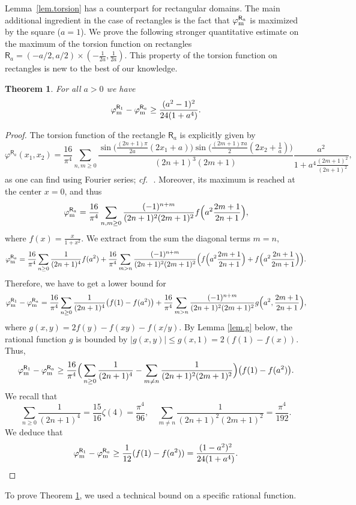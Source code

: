 \documentclass[11pt,a4paper]{amsart}
\newcounter{counter_a}
\newcommand{\cf}{{\it cf.}\,}
\numberwithin{figure}{section}
\numberwithin{equation}{section}
\theoremstyle{plain}%
\theoremstyle{remark}
\theoremstyle{plain}
\newtheorem{theorem}{Theorem}
\begin{document}
Lemma~\ref{lem.torsion} has a counterpart for rectangular domains. The main additional ingredient in the case of rectangles is the fact that $\varphi^{\mathsf R_a}_{\rm m}$ is maximized by the square ($a=1$). We prove the following
stronger quantitative estimate on the maximum of the torsion function on rectangles $\mathsf R_a=(-a/2,a/2)\times (- \frac{1}{2a},\frac{1}{2a})$. This property of the torsion function on rectangles is new to the best of our knowledge. 
\begin{theorem}\label{thm.rect}
	For all $a>0$ we have
	\[  \varphi_{\rm m}^{\mathsf R_1} - \varphi_{\rm m}^{\mathsf R_a} \geq \frac{(a^2-1)^2}{24(1+a^4)}.\]
\end{theorem}

\begin{proof}
	The torsion function of the rectangle $\mathsf R_a$ is explicitly given by
	\[ \varphi^{\mathsf R_a}(x_1,x_2) = \frac{16}{\pi^4} \sum_{n, m \geq 0} \frac{\sin \Big( \frac{(2n+1)\pi}{2a}(2x_1+a) \Big) \sin \Big( \frac{(2m+1)\pi a}{2}(2x_2+ \frac 1a) \Big)}{(2n+1)^3(2m+1)} \frac{a^2}{1+ a^4\frac{(2m+1)^2}{(2n+1)^2}},\]
	as one can find using Fourier series; \cf~\cite[Section 7]{BM24}. Moreover, its maximum is reached at the center $x=0$, and thus
	\[ \varphi_{\rm m}^{\mathsf R_a} = \frac{16}{\pi^4} \sum_{n,m \geq 0} \frac{(-1)^{n+m}}{(2n+1)^2(2m+1)^2}f \Big( a^2 \frac{2m+1}{2n+1} \Big),\]
	where $f(x) = \frac{x}{1+x^2}$. We extract from the sum the diagonal terms $m=n$,
	\[ \varphi_{\rm m}^{\mathsf R_a} = \frac{16}{\pi^4} \sum_{n \geq 0} \frac{1}{(2n+1)^4} f(a^2) + \frac{16}{\pi^4} \sum_{m >n}  \frac{(-1)^{n+m}}{(2n+1)^2(2m+1)^2} \Big( f \Big( a^2 \frac{2m+1}{2n+1} \Big) + f \Big( a^2 \frac{2n+1}{2m+1} \Big) \Big).\]
	Therefore, we have to get a lower bound for
	\[ \varphi_{{\rm m}}^{\mathsf R_1} - \varphi_{{\rm m}}^{\mathsf R_a} = \frac{16}{\pi^4} \sum_{n \geq 0} \frac{1}{(2n+1)^4} \big( f(1)-f(a^2) \big) + \frac{16}{\pi^4} \sum_{m >n}  \frac{(-1)^{n+m}}{(2n+1)^2(2m+1)^2} g \Big(a^2, \frac{2m+1}{2n+1} \Big),\]
	where $g(x,y) = 2f(y) - f(xy) - f(x/y)$.  By Lemma \ref{lem.g} below, the rational function $g$ is bounded by $|g(x,y)| \leq g(x,1) = 2(f(1)-f(x))$. Thus,
	\[ \varphi_{{\rm m}}^{\mathsf R_1} - \varphi_{{\rm m}}^{\mathsf R_a} \geq \frac{16}{\pi^4} \Big( \sum_{n \geq 0} \frac{1}{(2n+1)^4} - \sum_{m \neq n}  \frac{1}{(2n+1)^2(2m+1)^2} \Big) \big( f(1)-f(a^2) \big).\]
	We recall that
	\[ \sum_{n\geq 0} \frac{1}{(2n+1)^4} = \frac{15}{16} \zeta(4) = \frac{\pi^4}{96}, \quad \sum_{m \neq n}  \frac{1}{(2n+1)^2(2m+1)^2} = \frac{\pi^4}{192}.\]
	We deduce that
	\[ \varphi_{{\rm m}}^{\mathsf R_1} - \varphi_{{\rm m}}^{\mathsf R_a} \geq \frac {1}{12} (f(1)-f(a^2)) = \frac{(1-a^2)^2}{24(1+a^4)}.\qedhere\]
\end{proof}
To prove Theorem \ref{thm.rect}, we used a technical bound on a specific rational function.
\end{document}
